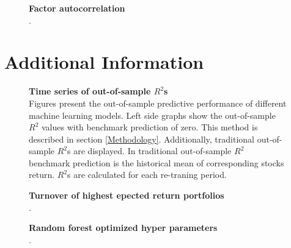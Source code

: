 \documentclass{article}
\begin{document}
\begin{figure}[h]
\centering
\caption[Factor autocorrelation]{\textbf{Factor autocorrelation}\\ .}

\label{plot:factor_autocorrelation}
\end{figure}

\clearpage

\section{Additional Information}
\renewcommand{\thefigure}{C.\arabic{figure}}
\setcounter{figure}{0}
\renewcommand{\thetable}{C.\arabic{table}}
\setcounter{table}{0}

\begin{figure}[h]
\centering
\caption[Time series of out-of-sample $R^2$]{\textbf{Time series of out-of-sample \boldmath$R^2$s}\\ Figures present the out-of-sample predictive performance of different machine learning models. Left side graphs show the out-of-sample $R^2$ values with benchmark prediction of zero. This method is described in section \ref{Methodology}. Additionally, traditional out-of-sample $R^2$s are displayed. In traditional out-of-sample $R^2$ benchmark prediction is the historical mean of corresponding stocks return. $R^2$s are calculated for each re-traning period.}

\label{plot:OOSR2_ts}
\end{figure}

\begin{figure}[h]
\centering
\caption[Turnover of highest epected return portfolios]{\textbf{Turnover of highest epected return portfolios}\\ .}

\label{plot:Turnover}
\end{figure}

\begin{figure}[h]
\centering
\caption[Optimized random forest hyperparameters]{\textbf{Random forest optimized hyper parameters}\\ .}

\label{plot:RFHyperParams}
\end{figure}

\clearpage


\end{document}
